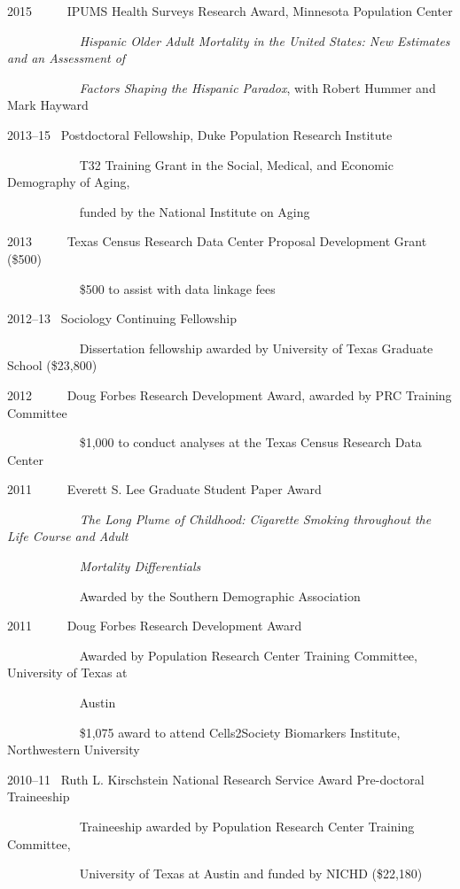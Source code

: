 \documentclass[11pt,]{article}
\begin{document}
2015 ~ ~ ~ IPUMS Health Surveys Research Award, Minnesota Population
Center\\
\strut ~ ~ ~ ~ ~ ~ ~ \emph{Hispanic Older Adult Mortality in the United
States: New Estimates and an Assessment of}\\
\strut ~ ~ ~ ~ ~ ~ ~ \emph{Factors Shaping the Hispanic Paradox}, with
Robert Hummer and Mark Hayward

2013--15 ~Postdoctoral Fellowship, Duke Population Research Institute\\
\strut ~ ~ ~ ~ ~ ~ ~ T32 Training Grant in the Social, Medical, and
Economic Demography of Aging,\\
\strut ~ ~ ~ ~ ~ ~ ~ funded by the National Institute on Aging

2013 ~ ~ ~ Texas Census Research Data Center Proposal Development Grant
(\$500)\\
\strut ~ ~ ~ ~ ~ ~ ~ \$500 to assist with data linkage fees

2012--13 ~Sociology Continuing Fellowship\\
\strut ~ ~ ~ ~ ~ ~ ~ Dissertation fellowship awarded by University of
Texas Graduate School (\$23,800)

2012 ~ ~ ~ Doug Forbes Research Development Award, awarded by PRC
Training Committee\\
\strut ~ ~ ~ ~ ~ ~ ~ \$1,000 to conduct analyses at the Texas Census
Research Data Center

2011 ~ ~ ~ Everett S. Lee Graduate Student Paper Award\\
\strut ~ ~ ~ ~ ~ ~ ~ \emph{The Long Plume of Childhood: Cigarette
Smoking throughout the Life Course and Adult}\\
\strut ~ ~ ~ ~ ~ ~ ~ \emph{Mortality Differentials}\\
\strut ~ ~ ~ ~ ~ ~ ~ Awarded by the Southern Demographic Association

2011 ~ ~ ~ Doug Forbes Research Development Award\\
\strut ~ ~ ~ ~ ~ ~ ~ Awarded by Population Research Center Training
Committee, University of Texas at\\
\strut ~ ~ ~ ~ ~ ~ ~ Austin\\
\strut ~ ~ ~ ~ ~ ~ ~ \$1,075 award to attend Cells2Society Biomarkers
Institute, Northwestern University

2010--11 ~Ruth L. Kirschstein National Research Service Award
Pre-doctoral Traineeship\\
\strut ~ ~ ~ ~ ~ ~ ~ Traineeship awarded by Population Research Center
Training Committee,\\
\strut ~ ~ ~ ~ ~ ~ ~ University of Texas at Austin and funded by NICHD
(\$22,180)
\end{document}
